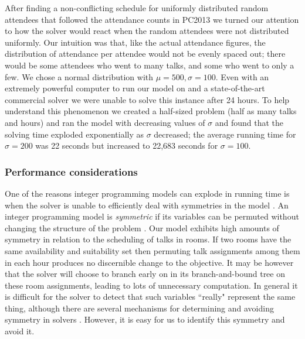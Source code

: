 \documentclass[]{article}
\theoremstyle{definition}
\theoremstyle{remark}
\numberwithin{equation}{section}
\begin{document}
After finding a non-conflicting schedule for uniformly distributed random attendees that followed the attendance counts in PC2013 we turned our attention to how the solver would react when the random attendees were not distributed uniformly. Our intuition was that, like the actual attendance figures, the distribution of attendance per attendee would not be evenly spaced out; there would be some attendees who went to many talks, and some who went to only a few. We chose a normal distribution with $\mu = 500, \sigma = 100$. Even with an extremely powerful computer to run our model on and a state-of-the-art commercial solver we were unable to solve this instance after 24 hours. To help understand this phenomenon we created a half-sized problem (half as many talks and hours) and ran the model with decreasing values of $\sigma$ and found that the solving time exploded exponentially as $\sigma$ decreased; the average running time for $\sigma = 200$ was 22 seconds but increased to 22,683 seconds for $\sigma = 100$.

\subsubsection{Performance considerations}
One of the reasons integer programming models can explode in running time is when the solver is unable to efficiently deal with symmetries in the model \cite{sherali}. An integer programming model is \emph{symmetric} if its variables can be permuted without changing the structure of the problem \cite{margot}. Our model exhibits high amounts of symmetry in relation to the scheduling of talks in rooms. If two rooms have the same availability and suitability set then permuting talk assignments among them in each hour produces no discernible change to the objective. It may be however that the solver will choose to branch early on in its branch-and-bound tree on these room assignments, leading to lots of unnecessary computation. In general it is difficult for the solver to detect that such variables ``really" represent the same thing, although there are several mechanisms for  determining and avoiding symmetry in solvers \cite{ostrowski}. However, it is easy for us to identify this symmetry and avoid it.
\end{document}

